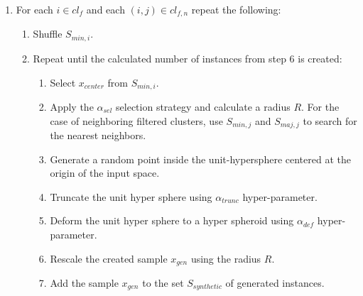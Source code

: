 \documentclass[parskip=full]{scrartcl}
\begin{document}
\begin{algorithm}[H]
\begin{enumerate}
		\item For each $i \in cl_{f}$ and each $(i, j) \in cl_{f, n}$ repeat the following:

		      \begin{enumerate}[label*=\arabic*.]

			      \item Shuffle $S_{min, i}$.

			      \item Repeat until the calculated number of instances from step 6 is created:

			            \begin{enumerate}[label*=\arabic*.]

				            \item Select $x_{center}$ from $S_{min, i}$.

				            \item Apply the $\alpha_{sel}$ selection strategy and calculate
				                  a radius $R$. For the case of neighboring filtered
				                  clusters, use $S_{min, j}$ and $S_{maj, j}$ to search for
				                  the nearest neighbors.

				            \item Generate a random point inside the unit-hypersphere
				                  centered at the origin of the input space.

				            \item Truncate the unit hyper sphere using $\alpha_{trunc}$
				                  hyper-parameter.

				            \item Deform the unit hyper sphere to a hyper spheroid using
				                  $\alpha_{def}$ hyper-parameter.

				            \item Rescale the created sample $x_{gen}$ using the radius $R$.

				            \item Add the sample $x_{gen}$ to the set $S_{synthetic}$ of
				                  generated instances.

			            \end{enumerate}

		      \end{enumerate}

	\end{enumerate}


\end{algorithm}
\end{document}
